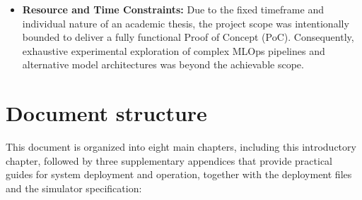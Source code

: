\begin{itemize}
    \item \textbf{Resource and Time Constraints:} Due to the fixed timeframe and individual nature of an academic thesis, the project scope was intentionally bounded to deliver a fully functional Proof of Concept (PoC). Consequently, exhaustive experimental exploration of complex MLOps pipelines and alternative model architectures was beyond the achievable scope.
\end{itemize}

\section{Document structure}
\label{sec:document_structure}

This document is organized into eight main chapters, including this introductory chapter, followed by three supplementary appendices that provide practical guides for system deployment and operation, together with the deployment files and the simulator specification:

